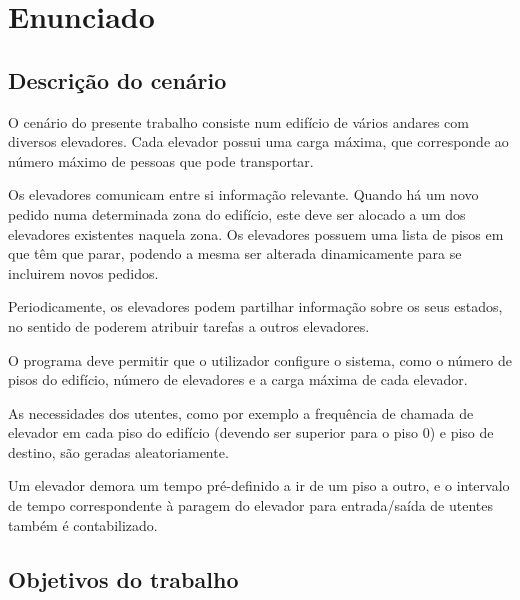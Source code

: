 \documentclass[a4paper]{article}
\begin{document}
\newpage

\tableofcontents



\newpage

\section{Enunciado}

\subsection{Descrição do cenário} 

O cenário do presente trabalho consiste num edifício de vários andares com diversos elevadores. Cada elevador possui uma carga máxima, que corresponde ao número máximo de pessoas que pode transportar.

Os elevadores comunicam entre si informação relevante. Quando há um novo pedido numa determinada zona do edifício, este deve ser alocado a um dos elevadores existentes naquela zona. Os elevadores possuem uma lista de pisos em que têm que parar, podendo a mesma ser alterada dinamicamente para se incluirem novos pedidos.

Periodicamente, os elevadores podem partilhar informação sobre os seus estados, no sentido de poderem atribuir tarefas a outros elevadores.

O programa deve permitir que o utilizador configure o sistema, como o número de pisos do edifício, número de elevadores e a carga máxima de cada elevador.

As necessidades dos utentes, como por exemplo a frequência de chamada de elevador em cada piso do edifício (devendo ser superior para o piso 0) e piso de destino, são geradas aleatoriamente. 

Um elevador demora um tempo pré-definido a ir de um piso a outro, e o intervalo de tempo correspondente à paragem do elevador para entrada/saída de utentes também é contabilizado.

\subsection{Objetivos do trabalho} 
\end{document}
